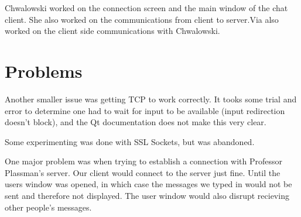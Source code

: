\documentclass[12pt]{article}
\begin{document}
Chwalowski worked on the connection screen and the main window of the chat client. She also worked on the communications from client to server.Via also worked on the client side communications with Chwalowski.

\section{Problems}
Another smaller issue was getting TCP to work correctly. It tooks some trial and
error to determine one had to wait for input to be available (input redirection
doesn't block), and the Qt documentation does not make this very clear. 

Some experimenting was done with SSL Sockets, but was abandoned.

One major problem  was when trying to establish a connection with Professor Plassman's server. Our client would connect to the server just fine. Until the users window was opened, in which case the messages we typed in would not be sent and therefore not displayed. The user window would also disrupt recieving other people's messages.  
\end{document}
